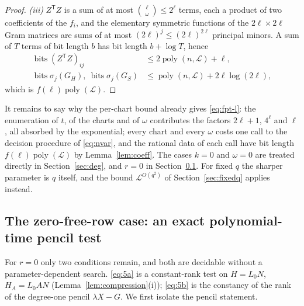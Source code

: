 \documentclass[journal]{IEEEtran}
\theoremstyle{plainn}
\theoremstyle{remark}
\begin{document}
\begin{proof}
\emph{(iii)} $Z^{\mathsf T}Z$ is a sum of at most
$\binom{\ell}{\omega}\le2^{\ell}$ terms, each a product of two coefficients of
the $f_i$, and the elementary symmetric functions of the $2\ell\times2\ell$ Gram
matrices are sums of at most $(2\ell)^{j}\le(2\ell)^{2\ell}$ principal minors. A
sum of $T$ terms of bit length $b$ has bit length $b+\log T$, hence
\begin{equation*}
\begin{aligned}
\operatorname{bits}(Z^{\mathsf T}Z)_{ij}
&\le2\operatorname{poly}(n,\mathcal L)+\ell,\\
\operatorname{bits}\sigma_j(G_H),\ \operatorname{bits}\sigma_j(G_S)
&\le\operatorname{poly}(n,\mathcal L)+2\ell\log(2\ell),
\end{aligned}
\end{equation*}
which is $f(\ell)\operatorname{poly}(\mathcal L)$.
\end{proof}

It remains to say why the per-chart bound already gives \eqref{eq:fpt-l}: the enumeration of
$t$, of the charts and of $\omega$ contributes the factors $2\ell+1$, $4^{\ell}$ and $\ell$, all
absorbed by the exponential; every chart and every $\omega$ costs one call to the decision procedure
of \eqref{eq:nvar}, and the rational data of each call have bit length
$f(\ell)\operatorname{poly}(\mathcal L)$ by Lemma~\ref{lem:coeff}. The cases $k=0$ and $\omega=0$
are treated directly in Section~\ref{sec:deg}, and $r=0$ in Section~\ref{sec:zero}. For fixed $q$
the sharper parameter is $q$ itself, and the bound $\mathcal L^{O(q^2)}$ of
Section~\ref{sec:fixedq} applies instead.

\subsection{The zero-free-row case: an exact polynomial-time pencil test}\label{sec:zero}

For $r=0$ only two conditions remain, and both are decidable without a
parameter-dependent search. \eqref{eq:5a} is a constant-rank test on
$H=L_0N$, $H_A=L_0AN$ (Lemma~\ref{lem:compression}(i)); \eqref{eq:5b} is the
constancy of the rank of the degree-one pencil $\lambda X-G$. We first isolate
the pencil statement.
\end{document}
